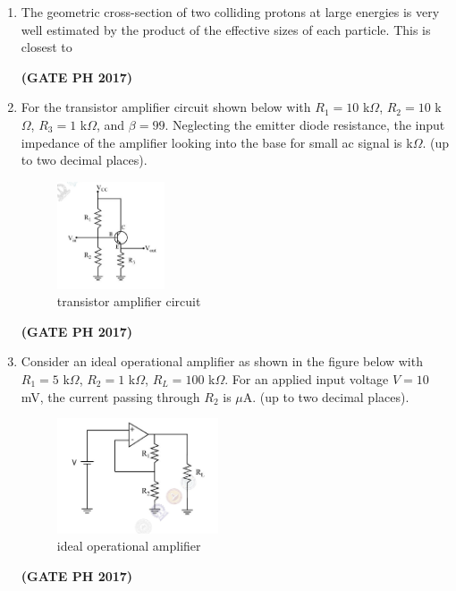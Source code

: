 \documentclass[14pt, a4paper]{extarticle}
\begin{document}
\begin{enumerate}[label=\textbf{Q.\arabic*}]
\item The geometric cross-section of two colliding protons at large energies is very well estimated by the product of the effective sizes of each particle. This is closest to
\begin{enumerate}
\end{enumerate}
\hfill \textbf{(GATE PH 2017)}

\item For the transistor amplifier circuit shown below with $R_1=10$ k$\Omega$, $R_2=10$ k$\Omega$, $R_3=1$ k$\Omega$, and $\beta=99$. Neglecting the emitter diode resistance, the input impedance of the amplifier looking into the base for small ac signal is \underline{\hspace{3cm}} k$\Omega$. (up to two decimal places).
\begin{figure}[H]
\centering
\includegraphics[width=0.3\textwidth]{figs/q52fig17.png}
\caption{transistor amplifier circuit}
\label{fig:q52}
\end{figure}
\hfill \textbf{(GATE PH 2017)}

\item Consider an ideal operational amplifier as shown in the figure below with $R_1=5$ k$\Omega$, $R_2=1$ k$\Omega$, $R_L=100$ k$\Omega$. For an applied input voltage $V=10$ mV, the current passing through $R_2$ is \underline{\hspace{3cm}} $\mu$A. (up to two decimal places).
\begin{figure}[H]
\centering
\includegraphics[width=0.45\textwidth]{figs/q53fig17.png}
\caption{ideal operational amplifier }
\label{fig:q53}
\end{figure}
\hfill \textbf{(GATE PH 2017)}


\end{enumerate}
\end{document}
